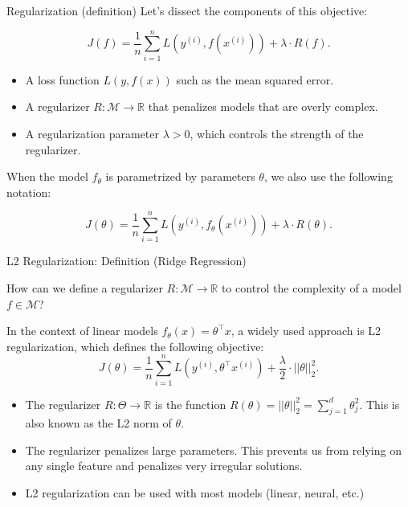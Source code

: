 \documentclass[../../main.tex]{subfiles}
\begin{document}
 \begin{frame}[fragile]{Regularization (definition)}
Let's dissect the components of this objective:

$$J(f) = \frac{1}{n} \sum_{i=1}^n L(y^{(i)}, f(x^{(i)})) + \lambda \cdot R(f).$$

\begin{itemize}
    \item A loss function $L(y, f(x))$ such as the mean squared error. 
\end{itemize}

\begin{itemize}
    \item A regularizer $R : \mathcal{M} \to \mathbb{R}$ that penalizes models that are overly complex.
\end{itemize}

\begin{itemize}
    \item A regularization parameter $\lambda > 0$, which controls the strength of the regularizer.
\end{itemize}

When the model $f_\theta$ is parametrized by parameters $\theta$, we also use the following notation:

$$J(\theta) = \frac{1}{n} \sum_{i=1}^n L(y^{(i)}, f_\theta(x^{(i)})) + \lambda \cdot R(\theta).$$
\end{frame}
\begin{frame}[fragile]{L2 Regularization: Definition (Ridge Regression)}
 
How can we define a regularizer $R: \mathcal{M} \to \mathbb{R}$ to control the complexity of a model $f \in \mathcal{M}$?


In the context of linear models $f_\theta(x) = \theta^\top x$, a widely used approach is L2 regularization, which defines the following objective:
$$J(\theta) = \frac{1}{n} \sum_{i=1}^n L(y^{(i)}, \theta^\top x^{(i)}) + \frac{\lambda}{2} \cdot ||\theta||_2^2.$$

\begin{itemize}
    \item The regularizer $R : \Theta \to \mathbb{R}$ is the function $R(\theta) = ||\theta||_2^2 = \sum_{j=1}^d \theta_j^2.$ This is also known as the L2 norm of $\theta$.
\end{itemize}

\begin{itemize}
    \item The regularizer penalizes large parameters. This prevents us from relying on any single feature and penalizes very irregular solutions.
\end{itemize}

\begin{itemize}
    \item L2 regularization can be used with most models (linear, neural, etc.)
\end{itemize}

\end{frame}
\end{document}
